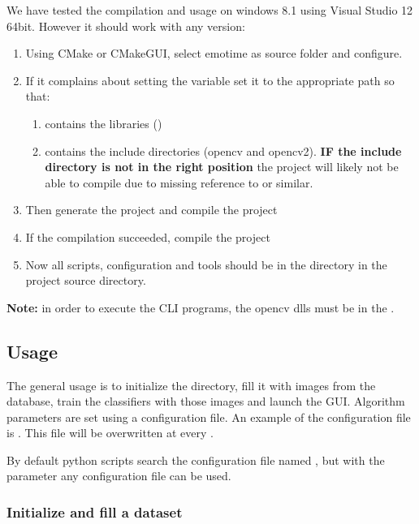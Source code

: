 We have tested the compilation and usage on windows 8.1 using Visual Studio 12
64bit. However it should work with any version:

\begin{enumerate}
  \item Using CMake or CMakeGUI, select emotime as source folder and configure.
  \item If it complains about setting the variable  set it to the appropriate path so that:
    \begin{enumerate}
      \item {} contains the libraries ()
      \item {} contains the include
        directories (opencv and opencv2). \textbf{IF the include directory is
        not in the right position} the project will likely not be able to
        compile due to missing reference to  or similar.
    \end{enumerate}
  \item Then generate the project and compile the project 
  \item If the compilation succeeded, compile the project 
  \item Now all scripts, configuration and tools should be in the directory
     in the project source directory.
\end{enumerate}

\textbf{Note:} in order to execute the CLI programs, the opencv dlls must be in
the .

\subsection{Usage}

The general usage is to initialize the  directory, fill it with
images from the  database, train the classifiers with those images and
launch the GUI\@. Algorithm parameters are set using a configuration file. An
example of the configuration file is . This file
will be overwritten at every .

By default python scripts search the configuration file named
, but with the parameter  any
configuration file can be used.

\subsubsection*{Initialize and fill a dataset}

